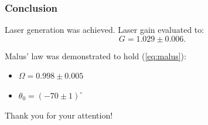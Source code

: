 \documentclass{beamer}
\begin{document}
	\begin{frame}
		\frametitle{Conclusion}
		
		Laser generation was achieved.
		Laser gain evaluated to:
		$$ G = 1.029 \pm 0.006.$$
		
		Malus' law was demonstrated to hold (\ref{eq:malus}):
		\begin{itemize}
			\centering
			\item[] $\Omega = 0.998 \pm 0.005$
			\item[] $\theta_0 = (-70 \pm 1)^\circ$
		\end{itemize}
	
	\end{frame}
	
	\begin{frame}[plain,c]
		
		\begin{center}
			\huge {} Thank you for your attention!
		\end{center}
		
	\end{frame}
	
\end{document}

